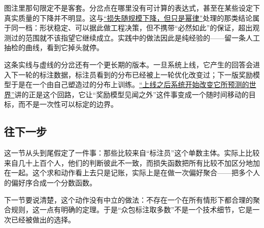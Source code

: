 图注里那句限定不是客套。分岔点在哪里没有可计算的表达式，甚至在某些设定下真实质量的下降并不明显。这与\hyperref[sec:14-Deep-Learning/09-Scaling-and-Adaptation/01]{``损失随规模下降，但只是幂律''}处理的那类结论属于同一档：形状稳定、可以据此做工程决策，但不携带``必然如此''的保证，超出观测过的范围就不该指望它继续成立。实践中的做法因此是纯经验的——留一条人工抽检的曲线，看到它掉头就停。

这条实线与虚线的分岔还有一个更长期的版本。一旦系统上线，它产生的回答会进入下一轮的标注数据，标注员看到的分布已经被上一轮优化改变过；下一版奖励模型于是在一个由自己塑造过的分布上训练。\hyperref[sec:18-Synthesis/01-System-Lifecycle/06]{``上线之后系统开始改变它所预测的世界''}讲的正是这个回路，它让``奖励模型见闻之外''这件事变成一个随时间移动的目标，而不是一次性可以标定的边界。

\subsection{往下一步}

这一节从头到尾假定了一件事：那些比较来自``标注员''这个单数主体。实际上比较来自几十上百个人，他们的判断彼此不一致，而损失函数把所有比较不加区分地加在一起。这个求和动作看上去只是记账，实际上是在做一次偏好聚合——把多个人的偏好序合成一个分数函数。

下一节要说清楚，这个动作没有中立的做法：不存在一个在所有情形下都合理的聚合规则，这一点有明确的定理。于是``众包标注取多数''不是一个技术细节，它是一次已经被做出的选择。
